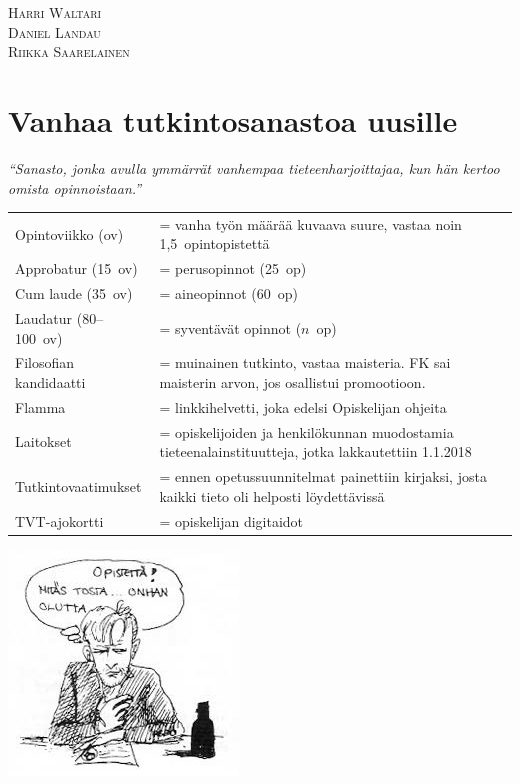 \documentclass[a5paper, 8pt, twocolumn]{book} %
\numberwithin{equation}{section}
\begin{document}
\vspace{0.5cm}
\noindent\textsc{Harri Waltari}\\
\textsc{Daniel Landau}\\
\textsc{Riikka Saarelainen}

\newpage\onecolumn\section{Vanhaa tutkintosanastoa uusille} {\small \itshape ``Sanasto, jonka avulla ymmärrät vanhempaa tieteenharjoittajaa, kun hän kertoo omista opinnoistaan.''}\vspace{0.5cm}
\begin{table}[h!]
\begin{tabularx}{\textwidth}{lX}
Opintoviikko (ov) &= vanha työn määrää kuvaava suure, vastaa noin
1,5~opintopistettä \\[5pt]
Approbatur (15~ov) &= perusopinnot (25~op) \\[5pt]
Cum laude (35~ov) &= aineopinnot (60~op) \\[5pt]
Laudatur (80--100~ov) & = syventävät opinnot ($n$~op)\\[5pt]
Filosofian kandidaatti &= muinainen tutkinto, vastaa maisteria. FK sai
maisterin arvon, jos osallistui promootioon. \\[5pt]
Flamma &= linkkihelvetti, joka edelsi Opiskelijan ohjeita\\[5pt]
Laitokset &= opiskelijoiden ja henkilökunnan muodostamia tieteenalainstituutteja, jotka lakkautettiin 1.1.2018\\[5pt]
Tutkintovaatimukset &= ennen opetussuunnitelmat painettiin kirjaksi, josta kaikki tieto oli helposti löydettävissä\\[5pt]
TVT-ajokortti &= opiskelijan digitaidot
\end{tabularx}
\centering\includegraphics{onhanolutta.png}
\end{table}
\newpage
\end{document}
